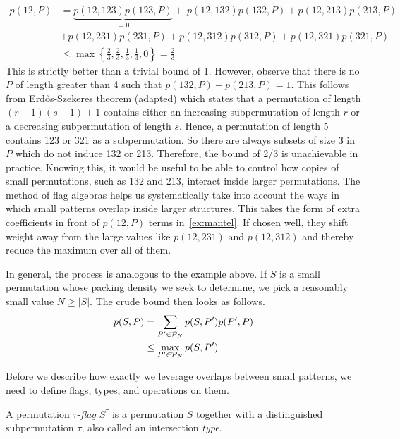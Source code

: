 \begin{equation}
\begin{aligned}
p(12, P) &= \underbrace{p(12, 123)p(123,P)}_{ = 0} +\ p(12, 132)p(132,P) + p(12, 213)p(213,P)\\
  &+ p(12, 231)p(231,P) + p(12, 312)p(312,P) + p(12,321)p(321,P)\\
  &\leq \max \left\{\frac{2}{3}, \frac{2}{3}, \frac{1}{3}, \frac{1}{3}, 0\right\} = \frac{2}{3}
\label{ex:mantel}
\end{aligned}
\end{equation}
This is strictly better than a trivial bound of 1. However, observe that there is no $P$ of length greater than 4 such that $p(132,P) + p(213,P) = 1$. This follows from Erd\H{o}s-Szekeres theorem (adapted) which states that a permutation of length $(r-1)(s-1)+1$ contains either an increasing subpermutation of length $r$ or a decreasing subpermutation of length $s$. Hence, a permutation of length 5 contains 123 or 321 as a subpermutation. So there are always subsets of size 3 in $P$ which do not induce 132 or 213. Therefore, the bound of 2/3 is unachievable in practice. Knowing this, it would be useful to be able to control how copies of small permutations, such as 132 and 213, interact inside larger permutations. The method of flag algebras helps us systematically take into account the ways in which small patterns overlap inside larger structures. This takes the form of extra coefficients in front of $p(12,P)$ terms in~\eqref{ex:mantel}. If chosen well, they shift weight away from the large values like $p(12,231)$ and $p(12,312)$ and thereby reduce the maximum over all of them.

In general, the process is analogous to the example above. If $S$ is a small permutation whose packing density we seek to determine, we pick a reasonably small value $N \geq |S|$. The crude bound then looks as follows.
\begin{align}
  p(S,P) &= \sum_{P' \in \P_N}p(S,P')p(P',P)\notag\\
  &\leq \max_{P' \in \P_N} p(S,P') \label{eq:crudebd}
\end{align}

Before we describe how exactly we leverage overlaps between small patterns, we need to define flags, types, and operations on them.

\begin{definition}[Flag]
\label{def:permflag}
A permutation $\tau$-\emph{flag} $S^{\tau}$ is a permutation $S$ together with a distinguished subpermutation $\tau$, also called an intersection \emph{type}.
\end{definition}

